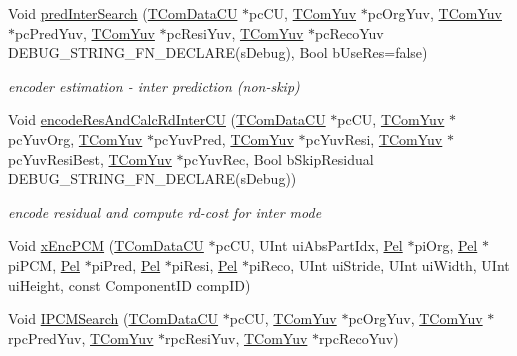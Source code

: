 \begin{DoxyCompactItemize}
\item 
Void \hyperlink{class_t_enc_search_a60b4d9f294aa8b0c1d03f4be57e707b5}{pred\+Inter\+Search} (\hyperlink{class_t_com_data_c_u}{T\+Com\+Data\+CU} $\ast$pc\+CU, \hyperlink{class_t_com_yuv}{T\+Com\+Yuv} $\ast$pc\+Org\+Yuv, \hyperlink{class_t_com_yuv}{T\+Com\+Yuv} $\ast$pc\+Pred\+Yuv, \hyperlink{class_t_com_yuv}{T\+Com\+Yuv} $\ast$pc\+Resi\+Yuv, \hyperlink{class_t_com_yuv}{T\+Com\+Yuv} $\ast$pc\+Reco\+Yuv D\+E\+B\+U\+G\+\_\+\+S\+T\+R\+I\+N\+G\+\_\+\+F\+N\+\_\+\+D\+E\+C\+L\+A\+RE(s\+Debug), Bool b\+Use\+Res=false)
\begin{DoxyCompactList}\small\item\em encoder estimation -\/ inter prediction (non-\/skip) \end{DoxyCompactList}\item 
Void \hyperlink{class_t_enc_search_abf4bab027ce2425740115f3b59fe7a1a}{encode\+Res\+And\+Calc\+Rd\+Inter\+CU} (\hyperlink{class_t_com_data_c_u}{T\+Com\+Data\+CU} $\ast$pc\+CU, \hyperlink{class_t_com_yuv}{T\+Com\+Yuv} $\ast$pc\+Yuv\+Org, \hyperlink{class_t_com_yuv}{T\+Com\+Yuv} $\ast$pc\+Yuv\+Pred, \hyperlink{class_t_com_yuv}{T\+Com\+Yuv} $\ast$pc\+Yuv\+Resi, \hyperlink{class_t_com_yuv}{T\+Com\+Yuv} $\ast$pc\+Yuv\+Resi\+Best, \hyperlink{class_t_com_yuv}{T\+Com\+Yuv} $\ast$pc\+Yuv\+Rec, Bool b\+Skip\+Residual D\+E\+B\+U\+G\+\_\+\+S\+T\+R\+I\+N\+G\+\_\+\+F\+N\+\_\+\+D\+E\+C\+L\+A\+RE(s\+Debug))
\begin{DoxyCompactList}\small\item\em encode residual and compute rd-\/cost for inter mode \end{DoxyCompactList}\item 
Void \hyperlink{class_t_enc_search_a70fe868f4c1120520e3bf5b65747aece}{x\+Enc\+P\+CM} (\hyperlink{class_t_com_data_c_u}{T\+Com\+Data\+CU} $\ast$pc\+CU, U\+Int ui\+Abs\+Part\+Idx, \hyperlink{_type_def_8h_af92141699657699b4b547be0c8517541}{Pel} $\ast$pi\+Org, \hyperlink{_type_def_8h_af92141699657699b4b547be0c8517541}{Pel} $\ast$pi\+P\+CM, \hyperlink{_type_def_8h_af92141699657699b4b547be0c8517541}{Pel} $\ast$pi\+Pred, \hyperlink{_type_def_8h_af92141699657699b4b547be0c8517541}{Pel} $\ast$pi\+Resi, \hyperlink{_type_def_8h_af92141699657699b4b547be0c8517541}{Pel} $\ast$pi\+Reco, U\+Int ui\+Stride, U\+Int ui\+Width, U\+Int ui\+Height, const Component\+ID comp\+ID)
\item 
\mbox{\label{class_t_enc_search_aea7a68b3dfe4fc000ca33e217ab86247}} 
Void \hyperlink{class_t_enc_search_aea7a68b3dfe4fc000ca33e217ab86247}{I\+P\+C\+M\+Search} (\hyperlink{class_t_com_data_c_u}{T\+Com\+Data\+CU} $\ast$pc\+CU, \hyperlink{class_t_com_yuv}{T\+Com\+Yuv} $\ast$pc\+Org\+Yuv, \hyperlink{class_t_com_yuv}{T\+Com\+Yuv} $\ast$rpc\+Pred\+Yuv, \hyperlink{class_t_com_yuv}{T\+Com\+Yuv} $\ast$rpc\+Resi\+Yuv, \hyperlink{class_t_com_yuv}{T\+Com\+Yuv} $\ast$rpc\+Reco\+Yuv)

\end{DoxyCompactItemize}
